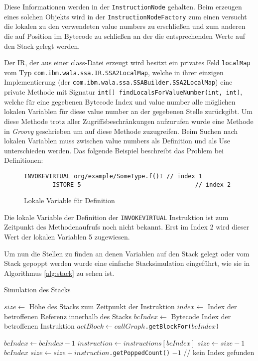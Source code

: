 Diese Informationen werden in der \texttt{InstructionNode} gehalten. Beim erzeugen 
eines solchen Objekts wird in der \texttt{InstructionNodeFactory} zum einen versucht
die lokalen zu den verwendeten value numbers zu erschließen und zum anderen die auf 
Position im Bytecode zu schließen an der die entsprechenden Werte auf den Stack gelegt 
werden.

Der IR, der aus einer class-Datei erzeugt wird besitzt ein privates Feld \texttt{localMap}
vom Typ \texttt{com.ibm.wala.ssa.IR.SSA2LocalMap}, welche in ihrer einzigen Implementierung
(der \texttt{com.ibm.wala.ssa.SSABuilder.SSA2LocalMap}) eine private Methode mit 
Signatur \texttt{int[] findLocalsForValueNumber(int, int)}, welche für eine gegebenen 
Bytecode Index und value number alle möglichen lokalen Variablen für diese value number 
an der gegebenen Stelle zurückgibt. Um diese Methode trotz aller Zugriffsbeschränkungen 
aufzurufen wurde eine Methode in \textit{Groovy} geschrieben um auf diese Methode 
zuzugreifen. Beim Suchen nach lokalen Variablen muss zwischen value numbers als Definition 
und als Use unterschieden werden. Das folgende Beispiel beschreibt das Problem bei 
Definitionen:

\begin{figure}[H]
	\begin{lstlisting}[language=Bytecode]
		INVOKEVIRTUAL org/example/SomeType.f()I // index 1
		ISTORE 5								// index 2
	\end{lstlisting}
	\caption{Lokale Variable für Definition}
\end{figure}

Die lokale Variable der Definition der \texttt{INVOKEVIRTUAL} Instruktion ist zum
Zeitpunkt des Methodenaufrufs noch nicht bekannt. Erst im Index 2 wird dieser Wert der 
lokalen Variablen 5 zugewiesen.

Um nun die Stellen zu finden an denen Variablen auf den Stack gelegt oder vom Stack 
gepoppt werden wurde eine einfache Stacksimulation eingeführt, wie sie in Algorithmus
\ref{alg:stack} zu sehen ist.

\begin{algorithm}[H]
	\caption{Simulation des Stacks}\label{alg:stack}
	\begin{algorithmic}[1]
		\STATE $size \gets$ Höhe des Stacks zum Zeitpunkt der Instruktion 
		\STATE $index \gets$ Index der betroffenen Referenz innerhalb des Stacks
		\STATE $bcIndex \gets$ Bytecode Index der betroffenen Instruktion
			\STATE \texttt{$actBlock \gets callGraph$.getBlockFor($bcIndex$)}

				\STATE $bcIndex \gets bcIndex - 1$
				\STATE $instruction \gets instructions[bcIndex]$
					\STATE $size \gets size - 1$
						\RETURN $bcIndex$ 
					\ENDIF
				\ENDIF
				\STATE \texttt{$size \gets size + instruction$.getPoppedCount()}
			\ENDWHILE	
		\ENDWHILE
		\RETURN $-1$ // kein Index gefunden
	\end{algorithmic}
\end{algorithm}

